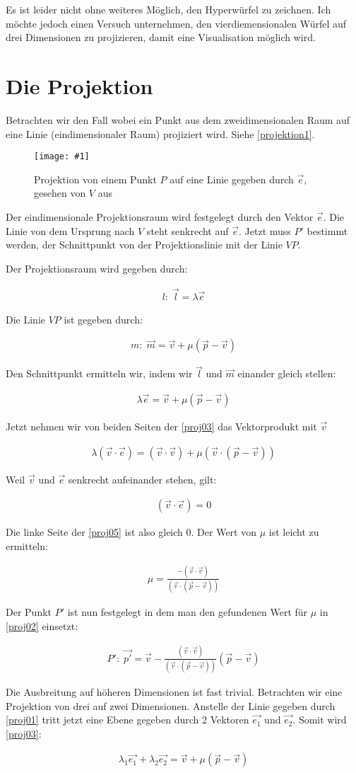 \documentclass[10pt,a4paper,twoside,titlepage]{article}
\newcommand{\myeq}[2]{
	\begin{equation}
		\begin{split}
			#1
		\end{split}
		\label{#2}
	\end{equation}
}
\newcommand{\image}[4]{
	\begin{figure}[!ht]
		\centering
		\texttt{[image: \#1]}
		\caption{#2}
		\label{#3}
	\end{figure}
}
\begin{document}
Es ist leider nicht ohne weiteres Möglich, den Hyperwürfel zu zeichnen.
Ich möchte jedoch einen Versuch unternehmen, den vierdiemensionalen Würfel
auf drei Dimensionen zu projizieren, damit eine Visualisation möglich wird.
\section{Die Projektion}
Betrachten wir den Fall wobei ein Punkt aus dem zweidimensionalen
Raum auf eine Linie (eindimensionaler Raum) projiziert wird.
Siehe \autoref{projektion1}.
\image{img/Projektion.eps}{Projektion von einem Punkt $P$ auf 
	eine Linie gegeben durch $\vec{e}$, gesehen von $V$ aus}
	{projektion1}{6}
	
Der eindimensionale Projektionsraum wird festgelegt durch den Vektor
$\vec{e}$. Die Linie von dem Ursprung nach $V$ steht senkrecht auf $\vec{e}$.
Jetzt muss $P'$ bestimmt werden, der Schnittpunkt von der
Projektionslinie mit der Linie $VP$.

Der Projektionsraum wird gegeben durch:
\myeq{l:\; \vec{l}=\lambda \vec{e}}{proj01}

Die Linie $VP$ ist gegeben durch:
\myeq{m:\; \vec{m}=\vec{v} + \mu(\vec{p}-\vec{v})}{proj02}

Den Schnittpunkt ermitteln wir, indem wir $\vec{l}$ und $\vec{m}$
einander gleich stellen:
\myeq{\lambda \vec{e} = \vec{v} + \mu(\vec{p}-\vec{v})}{proj03}


Jetzt nehmen wir von beiden Seiten der \autoref{proj03} das Vektorprodukt
mit $\vec{v}$
\myeq{\lambda(\vec{v}\cdot\vec{e}) = (\vec{v}\cdot\vec{v}) + \mu 
	(\vec{v}\cdot(\vec{p}-\vec{v}))}{proj05}

Weil $\vec{v}$ und $\vec{e}$ senkrecht aufeinander stehen, gilt:
\myeq{(\vec{v}\cdot\vec{e}) = 0}{proj04}

Die linke Seite der \autoref{proj05} ist also gleich 0. Der Wert von
$\mu$ ist leicht zu ermitteln:
\myeq{\mu = \frac{-(\vec{v}\cdot\vec{v})}
	{(\vec{v}\cdot(\vec{p}-\vec{v}))}}{proj06}
	
Der Punkt $P'$ ist nun festgelegt in dem man den gefundenen Wert
für $\mu$ in \autoref{proj02} einsetzt:
\myeq{P':\; \vec{p'} = \vec{v} -  \frac{(\vec{v}\cdot\vec{v})}
	{(\vec{v}\cdot(\vec{p}-\vec{v}))}(\vec{p}-\vec{v})}{proj07}

Die Ausbreitung auf höheren Dimensionen ist fast trivial. Betrachten wir
eine Projektion von drei auf zwei Dimensionen. Anstelle der Linie gegeben durch
\autoref{proj01} tritt jetzt eine Ebene gegeben durch 2 Vektoren
$\vec{e_1}$ und $\vec{e_2}$. Somit wird \autoref{proj03}:
\myeq{
	\lambda_1\vec{e_1} + \lambda_2\vec{e_2} = \vec{v} + \mu(\vec{p}-\vec{v})
}{proj08}
\end{document}
